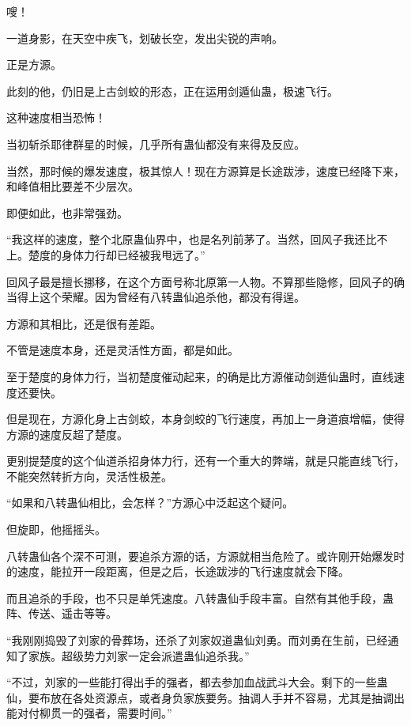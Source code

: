 
\begin{this_body}

嗖！

一道身影，在天空中疾飞，划破长空，发出尖锐的声响。

正是方源。

此刻的他，仍旧是上古剑蛟的形态，正在运用剑遁仙蛊，极速飞行。

这种速度相当恐怖！

当初斩杀耶律群星的时候，几乎所有蛊仙都没有来得及反应。

当然，那时候的爆发速度，极其惊人！现在方源算是长途跋涉，速度已经降下来，和峰值相比要差不少层次。

即便如此，也非常强劲。

“我这样的速度，整个北原蛊仙界中，也是名列前茅了。当然，回风子我还比不上。楚度的身体力行却已经被我甩远了。”

回风子最是擅长挪移，在这个方面号称北原第一人物。不算那些隐修，回风子的确当得上这个荣耀。因为曾经有八转蛊仙追杀他，都没有得逞。

方源和其相比，还是很有差距。

不管是速度本身，还是灵活性方面，都是如此。

至于楚度的身体力行，当初楚度催动起来，的确是比方源催动剑遁仙蛊时，直线速度还要快。

但是现在，方源化身上古剑蛟，本身剑蛟的飞行速度，再加上一身道痕增幅，使得方源的速度反超了楚度。

更别提楚度的这个仙道杀招身体力行，还有一个重大的弊端，就是只能直线飞行，不能突然转折方向，灵活性极差。

“如果和八转蛊仙相比，会怎样？”方源心中泛起这个疑问。

但旋即，他摇摇头。

八转蛊仙各个深不可测，要追杀方源的话，方源就相当危险了。或许刚开始爆发时的速度，能拉开一段距离，但是之后，长途跋涉的飞行速度就会下降。

而且追杀的手段，也不只是单凭速度。八转蛊仙手段丰富。自然有其他手段，蛊阵、传送、遥击等等。

“我刚刚捣毁了刘家的骨葬场，还杀了刘家奴道蛊仙刘勇。而刘勇在生前，已经通知了家族。超级势力刘家一定会派遣蛊仙追杀我。”

“不过，刘家的一些能打得出手的强者，都去参加血战武斗大会。剩下的一些蛊仙，要布放在各处资源点，或者身负家族要务。抽调人手并不容易，尤其是抽调出能对付柳贯一的强者，需要时间。”


\end{this_body}
